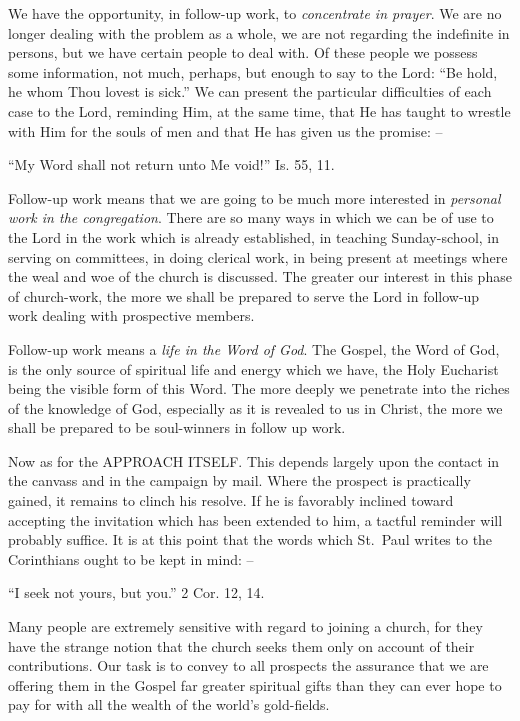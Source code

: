 \documentclass[
]{book}
\begin{document}
We have the opportunity, in follow-up work, to \emph{concentrate in prayer}. We are no longer dealing with the problem as a whole, we are not regarding the indefinite in persons, but we have certain people to deal with. Of these people we possess some information, not much, perhaps, but enough to say to the Lord: ``Be hold, he whom Thou lovest is sick.'' We can present the particular difficulties of each case to the Lord, reminding Him, at the same time, that He has taught to wrestle with Him for the souls of men and that He has given us the promise: --

``My Word shall not return unto Me void!'' Is. 55, 11.

Follow-up work means that we are going to be much more interested in \emph{personal work in the congregation}. There are so many ways in which we can be of use to the Lord in the work which is already established, in teaching Sunday-school, in serving on committees, in doing clerical work, in being present at meetings where the weal and woe of the church is discussed. The greater our interest in this phase of church-work, the more we shall be prepared to serve the Lord in follow-up work dealing with prospective members.

Follow-up work means a \emph{life in the Word of God}. The Gospel, the Word of God, is the only source of spiritual life and energy which we have, the Holy Eucharist being the visible form of this Word. The more deeply we penetrate into the riches of the knowledge of God, especially as it is revealed to us in Christ, the more we shall be prepared to be soul-winners in follow up work.

Now as for the APPROACH ITSELF. This depends largely upon the contact in the canvass and in the campaign by mail. Where the prospect is practically gained, it remains to clinch his resolve. If he is favorably inclined toward accepting the invitation which has been extended to him, a tactful reminder will probably suffice. It is at this point that the words which St.~Paul writes to the Corinthians ought to be kept in mind: --

``I seek not yours, but you.'' 2 Cor. 12, 14.

Many people are extremely sensitive with regard to joining a church, for they have the strange notion that the church seeks them only on account of their contributions. Our task is to convey to all prospects the assurance that we are offering them in the Gospel far greater spiritual gifts than they can ever hope to pay for with all the wealth of the world's gold-fields.
\end{document}
